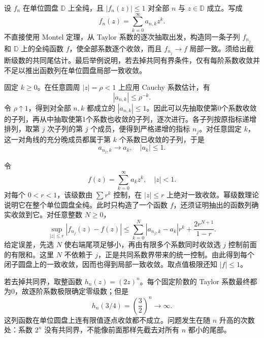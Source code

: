 \begin{exercise}\label{b3:ex:04-3}
设 \(f_n\) 在单位圆盘 \(\mathbb D\) 上全纯，且 \(|f_n(z)|\le1\) 对全部 \(n\) 与 \(z\in\mathbb D\) 成立。写成
\[
 f_n(z)=\sum_{k=0}^{\infty}a_{n,k}z^k.
\]
不直接使用 Montel 定理，从 Taylor 系数的逐次抽取出发，构造同一条子列 \(f_{n_j}\) 和 \(\mathbb D\) 上的全纯函数 \(f\)，使全部系数逐个收敛，而且 \(f_{n_j}\to f\) 局部一致。须给出截断级数的共同尾估计。最后举例说明，若去掉共同有界条件，仅有每阶系数收敛并不足以推出函数列在单位圆盘局部一致收敛。
\end{exercise}
\begin{solution}
固定 \(k\ge0\)。在任意圆周 \(|z|=\rho<1\) 上应用 Cauchy 系数估计，有
\[
 |a_{n,k}|\le\rho^{-k}.
\]
令 \(\rho\uparrow1\)，得到对全部 \(n,k\) 都成立的 \(|a_{n,k}|\le1\)。因此可以先抽取使第0个系数收敛的子列，再从中抽取使第1个系数也收敛的子列，逐次进行。各子列按原指标递增排列，取第 \(j\) 次子列的第 \(j\) 个成员，便得到严格递增的指标 \(n_j\)。对任意固定 \(k\)，这一对角线的充分晚成员都属于第 \(k\) 个系数已收敛的子列，于是
\[
 a_{n_j,k}\longrightarrow a_k,
 \quad |a_k|\le1.
\]

令
\[
 f(z)=\sum_{k=0}^{\infty}a_kz^k,
 \quad |z|<1.
\]
对每个 \(0<r<1\)，该级数由 \(\sum r^k\) 控制，在 \(|z|\le r\) 上绝对一致收敛。幂级数理论说明它在整个单位圆盘全纯。此时只构造了一个函数 \(f\)，还须证明抽出的函数列确实收敛到它。对任意整数 \(N\ge0\)，
\[
 \sup_{|z|\le r}|f_{n_j}(z)-f(z)|
 \le
 \sum_{k=0}^{N}|a_{n_j,k}-a_k|r^k
 +\frac{2r^{N+1}}{1-r}.
\]
给定误差，先选 \(N\) 使右端尾项足够小，再由有限多个系数同时收敛选 \(j\) 控制前面的有限和。这里 \(N\) 不依赖于 \(j\)，正是共同系数界带来的统一控制。由此得到每个闭子圆盘上的一致收敛，因而也得到局部一致收敛。取点值极限还知 \(|f|\le1\)。

若去掉共同界，取整函数 \(h_n(z)=(2z)^n\)。每个固定阶数的 Taylor 系数最终都为0，故逐阶系数极限确定零级数；但是
\[
 h_n(3/4)=\left(\frac32\right)^n\longrightarrow\infty.
\]
这列函数在单位圆盘上连有限值逐点收敛都不成立。问题发生在随 \(n\) 升高的次数处：系数 \(2^n\) 没有共同界，不能像前面那样先截去对所有 \(n\) 都小的尾部。
\end{solution}

